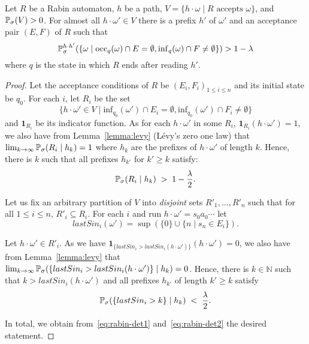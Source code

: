 \documentclass[a4paper,UKenglish]{lipics}
\newcommand{\idf}{\mathbf{1}}
\renewcommand{\Pr}[3][]{\ifblank{#1}{\mathbb{P}_{#2}}{\mathbb{P}^{#1}_{#2}}(#3)}
\newcommand{\rabin}{R}
\newcommand{\Nset}{\mathbb{N}}
\newcommand{\occu}{\mathrm{occ}}
\newcommand{\infi}{\mathrm{inf}}
\begin{document}
\begin{lemma}\label{lemma:rabin-determined}
	Let $R$ be a Rabin automaton, $h$ be a path, $V = \{h \cdot \omega \mid R \text{ accepts } \omega \}$, and $\Pr{\sigma}{V} > 0$.
For almost all $h \cdot \omega' \in V$ there is a prefix $h'$ of $\omega'$ and an acceptance pair $(E,F)$ of $\rabin$ such that	$$\Pr[h\cdot h']{\sigma}{\{\omega \mid \occu_{q}(\omega)\cap E = \emptyset, \infi_{q}(\omega) \cap F \neq \emptyset \}} > 1-\lambda$$
	where $q$ is the state in which $\rabin$ ends after reading $h'$. 
\end{lemma}
\begin{proof}
	Let the acceptance conditions of $R$ be $(E_i,F_i)_{1 \leq i \leq n}$ and its initial state be $q_0$. 
For each $i$, let $R_i$ be the set $$\{h\cdot \omega' \in V \mid 
	\infi_{q_0}(\omega') \cap E_i = \emptyset,
	\infi_{q_0}(\omega') \cap F_i \neq \emptyset \}$$ and $\mathbf{1}_{R_i}$ be its indicator function.
As for each $h\cdot \omega'$ in some 
$R_i$, 
	$\idf_{R_i}(h\cdot \omega') = 1$, we also have from Lemma~\ref{lemma:levy} (Lévy's zero one law) that $\lim_{k\to\infty} \Pr{\sigma}{R_i \mid h_k} = 1$ where $h_k$ are the prefixes of $h\cdot \omega'$ of length $k$. 
Hence, there is $k$ such that all prefixes $h_{k'}$ for $k'\geq k$ satisfy:
\begin{align}\label{eq:rabin-det1}
	\Pr{\sigma}{ R_i \mid h_k  } 
\;>\;
	1-\frac{\lambda}{2}.
	\end{align}
	
	Let us fix an arbitrary partition of $V$ into \emph{disjoint} sets $R'_1, \ldots, R'_n$ such that for all $1 \leq i \leq n$, $R'_i \subseteq R_i$. 
For each $i$ and run $h\cdot \omega' = s_0 a_0 \cdots $ let $$lastSin_i(\omega') = \sup(\{0\} \cup \{n \mid s_n \in E_i \}).$$
	


	Let $h\cdot \omega' \in R'_i$. 
As we have $\idf_{\{lastSin_i > lastSin_i(h\cdot \omega' )\}}(h\cdot \omega' ) = 0$, we also have from Lemma~\ref{lemma:levy} that $\lim_{k\to\infty} \Pr{\sigma}{\{lastSin_i > lastSin_i(h\cdot \omega')\} \mid h_k} = 0$.  Hence, there is $k \in \Nset$ such that $k > lastSin_i(h\cdot \omega' )$ and all prefixes $h_{k'}$ of length $k' \geq k$ satisfy
	\begin{align}\label{eq:rabin-det2}
	\Pr{\sigma}{ \{lastSin_i > k\} \mid h_k  } 
	\;<\;
	\frac{\lambda}{2}.
	\end{align}
	


	\noindent
	In total, we obtain from~\ref{eq:rabin-det1} and~\ref{eq:rabin-det2} the desired statement.
\end{proof}
\end{document}
